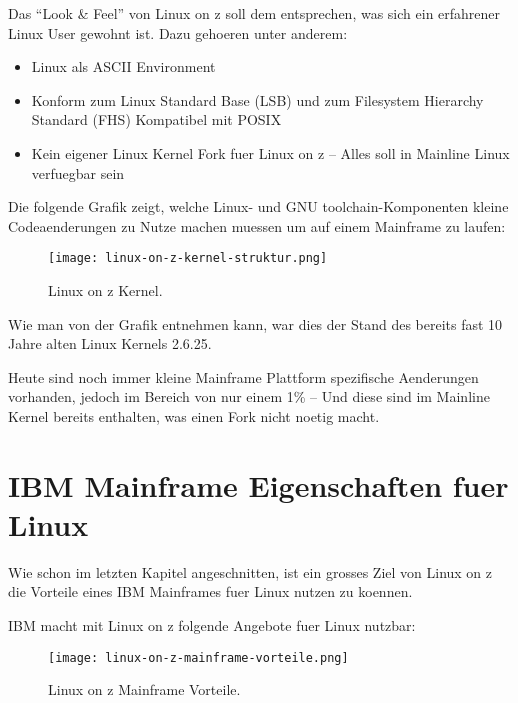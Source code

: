 Das “Look \& Feel” von Linux on z soll dem entsprechen, was sich ein erfahrener Linux User gewohnt ist. Dazu gehoeren unter anderem:

\begin{itemize}
    \item{Linux als ASCII Environment}
    \item{Konform zum Linux Standard Base (LSB) und zum Filesystem Hierarchy Standard (FHS) Kompatibel mit POSIX}
    \item{Kein eigener Linux Kernel Fork fuer Linux on z -- Alles soll in Mainline Linux verfuegbar sein}
\end{itemize}

Die folgende Grafik zeigt, welche Linux- und GNU toolchain-Komponenten kleine Codeaenderungen zu Nutze machen muessen um auf einem Mainframe zu laufen:

\begin{figure}[h!]
\centering
\texttt{[image: linux-on-z-kernel-struktur.png]}
\caption{Linux on z Kernel\cite{LinuxOnZKernel}.}
\label{fig:LinuxOnZKernel}
\end{figure}

Wie man von der Grafik entnehmen kann, war dies der Stand des bereits fast 10 Jahre alten Linux Kernels 2.6.25.

Heute sind noch immer kleine Mainframe Plattform spezifische Aenderungen vorhanden, jedoch im Bereich von nur einem 1\%\cite{LinuxOnZSpecCode} -- Und diese sind im Mainline Kernel bereits enthalten, was einen Fork nicht noetig macht.

\section{IBM Mainframe Eigenschaften fuer Linux}

Wie schon im letzten Kapitel angeschnitten, ist ein grosses Ziel von Linux on z die Vorteile eines IBM Mainframes fuer Linux nutzen zu koennen.

IBM macht mit Linux on z folgende Angebote fuer Linux nutzbar:

\begin{figure}[h!]
\centering
\texttt{[image: linux-on-z-mainframe-vorteile.png]}
\caption{Linux on z Mainframe Vorteile\cite{LinuxOnZMainframeVorteile}.}
\label{fig:LinuxOnZMainframeVorteile}
\end{figure}

